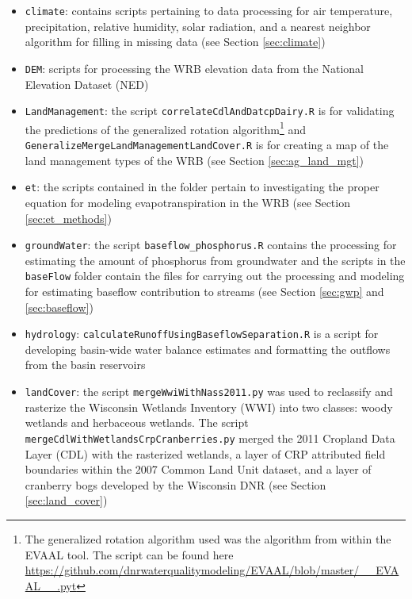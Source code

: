 \begin{itemize}
\item \texttt{climate}: contains scripts pertaining to data processing for air temperature, precipitation, relative humidity, solar radiation, and a nearest neighbor algorithm for filling in missing data (see Section \ref{sec:climate})

\item \texttt{DEM}: scripts for processing the WRB elevation data from the National Elevation Dataset (NED)

\item \texttt{LandManagement}: the script \texttt{correlateCdlAndDatcpDairy.R} is for validating the predictions of the generalized rotation algorithm\footnote{The generalized rotation algorithm used was the algorithm from within the EVAAL tool. The script can be found here \url{https://github.com/dnrwaterqualitymodeling/EVAAL/blob/master/__EVAAL__.pyt}} and \texttt{GeneralizeMergeLandManagementLandCover.R} is for creating a map of the land management types of the WRB (see Section \ref{sec:ag_land_mgt})

\item \texttt{et}: the scripts contained in the folder pertain to investigating the proper equation for modeling evapotranspiration in the WRB (see Section \ref{sec:et_methods})

\item \texttt{groundWater}: the script \texttt{baseflow\_phosphorus.R} contains the processing for estimating the amount of phosphorus from groundwater and the scripts in the \texttt{baseFlow} folder contain the files for carrying out the processing and modeling for estimating baseflow contribution to streams (see Section \ref{sec:gwp} and \ref{sec:baseflow})

\item \texttt{hydrology}: \texttt{calculateRunoffUsingBaseflowSeparation.R} is a script for developing  basin-wide water balance estimates and formatting the outflows from the basin reservoirs

\item \texttt{landCover}: the script \texttt{mergeWwiWithNass2011.py} was used to reclassify and rasterize the Wisconsin Wetlands Inventory (WWI) into two classes: woody wetlands and herbaceous wetlands. The script \texttt{mergeCdlWithWetlandsCrpCranberries.py} merged the 2011 Cropland Data Layer (CDL) with the rasterized wetlands, a layer of CRP attributed field boundaries within the 2007 Common Land Unit dataset, and a layer of cranberry bogs developed by the Wisconsin DNR (see Section \ref{sec:land_cover})


\end{itemize}
